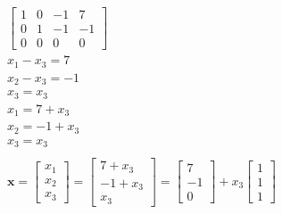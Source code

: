 \documentclass[12pt letter]{report}
\begin{document}
{\begin{align*}
\begin{bmatrix}
      1 & 0 & -1 & 7  \\
      0 & 1 & -1 & -1 \\
      0 & 0 & 0  & 0
    \end{bmatrix}
    \\
    x_1 - x_3 = 7    \\
    x_2 - x_3 = -1   \\
    x_3 = x_3
    \\
    x_1 = 7 + x_3    \\
    x_2 = -1 + x_3   \\
    x_3 = x_3        \\
    \\
    \mathbf{x} = \begin{bmatrix} x_1 \\  x_2 \\ x_3 \end{bmatrix}  = \begin{bmatrix} 7 + x_3 \\  -1 + x_3 \\ x_3
                                                                     \end{bmatrix}  = \begin{bmatrix} 7 \\ -1 \\ 0 \end{bmatrix}  + x_3 \begin{bmatrix} 1 \\  1\\ 1 \end{bmatrix}
  \end{align*}
}
\end{document}
